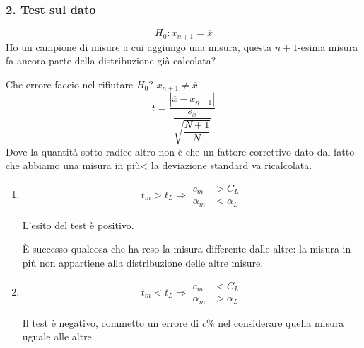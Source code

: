 \documentclass[a4paper, 15pt]{article}
\begin{document}
\subsubsection{2. Test sul dato}
\begin{adjustwidth}{2in}{}		
\[H_0: x_{n+1} = \overline{x}\]	
	Ho un campione di misure a cui aggiungo una misura, questa $n+1$-esima misura fa ancora parte della distribuzione già calcolata? \newline 
	
	Che errore faccio nel rifiutare $H_0$? \(x_{n+1} \ne \overline{x}\)
	\[t = \dfrac{|\overline{x}-x_{n+1}|}{\dfrac{s_x}{\sqrt{\dfrac{N+1}{N}}}}\]
	Dove la quantità sotto radice altro non è che un fattore correttivo dato dal fatto che abbiamo una misura in più< la deviazione standard va ricalcolata. 
		\begin{enumerate}
		\item \[t_m>t_L \Rightarrow \begin{aligned}
			c_m&>C_L \\
			\alpha_m&<\alpha_L
		\end{aligned}\]
		
		L'esito del test è positivo.
		
		È successo qualcosa che ha reso la misura differente dalle altre: la misura in più non appartiene alla distribuzione delle altre misure. 
		
		\item \[t_m<t_L \Rightarrow \begin{aligned}
			c_m&<C_L \\
			\alpha_m&>\alpha_L
		\end{aligned}\]
		
		Il test è negativo, commetto un errore di $c\%$ nel considerare quella misura uguale alle altre. 
		\end{enumerate}
\end{adjustwidth}
\end{document}
